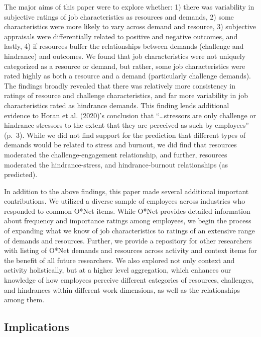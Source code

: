 \documentclass[
  man]{apa7}
\begin{document}
The major aims of this paper were to explore whether: 1) there was variability in subjective ratings of job characteristics as resources and demands, 2) some characteristics were more likely to vary across demand and resource, 3) subjective appraisals were differentially related to positive and negative outcomes, and lastly, 4) if resources buffer the relationships between demands (challenge and hindrance) and outcomes. We found that job characteristics were not uniquely categorized as a resource or demand, but rather, some job characteristics were rated highly as both a resource and a demand (particularly challenge demands). The findings broadly revealed that there was relatively more consistency in ratings of resource and challenge characteristics, and far more variability in job characteristics rated as hindrance demands. This finding lends additional evidence to Horan et al. (2020)'s conclusion that ``\ldots stressors are only challenge or hindrance stressors to the extent that they are perceived as such by employees'' (p.~3). While we did not find support for the prediction that different types of demands would be related to stress and burnout, we did find that resources moderated the challenge-engagement relationship, and further, resources moderated the hindrance-stress, and hindrance-burnout relationships (as predicted).

In addition to the above findings, this paper made several additional important contributions. We utilized a diverse sample of employees across industries who responded to common O*Net items. While O*Net provides detailed information about frequency and importance ratings among employees, we begin the process of expanding what we know of job characteristics to ratings of an extensive range of demands and resources. Further, we provide a repository for other researchers with listing of O*Net demands and resources across activity and context items for the benefit of all future researchers. We also explored not only context and activity holistically, but at a higher level aggregation, which enhances our knowledge of how employees perceive different categories of resources, challenges, and hindrances within different work dimensions, as well as the relationships among them.

\hypertarget{implications}{%
\subsection{Implications}\label{implications}}
\end{document}
